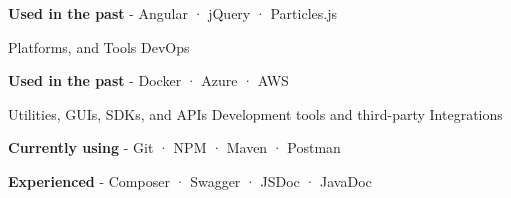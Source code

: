 \begin{cventries}
{\begin{cvitems}
        \item {\textbf{Used in the past} \hspace{0.03cm} - \hspace{0.03cm} Angular \hspace{0.03cm} · \hspace{0.03cm} jQuery \hspace{0.03cm} · \hspace{0.03cm} Particles.js \\} %
      \end{cvitems}
    }
  \cventry
    {Platforms, and Tools} %
    {DevOps} %
    {} %
    {} %
    {
      \begin{cvitems} %
        \item {\textbf{Used in the past} \hspace{0.03cm} - \hspace{0.03cm} Docker \hspace{0.03cm} · \hspace{0.03cm} Azure \hspace{0.03cm} · \hspace{0.03cm} AWS \\} %
      \end{cvitems}
    }
  \cventry
    {Utilities, GUIs, SDKs, and APIs} %
    {Development tools and third-party Integrations} %
    {} %
    {} %
    {
      \begin{cvitems} %
        \item {\textbf{Currently using} \hspace{0.03cm} - \hspace{0.03cm} Git \hspace{0.03cm} · \hspace{0.03cm} NPM \hspace{0.03cm} · \hspace{0.03cm} Maven \hspace{0.03cm} · \hspace{0.03cm} Postman} %
        \item {\textbf{Experienced} \hspace{0.03cm} - \hspace{0.03cm} Composer \hspace{0.03cm} · \hspace{0.03cm} Swagger \hspace{0.03cm} · \hspace{0.03cm} JSDoc \hspace{0.03cm} · \hspace{0.03cm} JavaDoc} %

\end{cvitems}}
\end{cventries}
